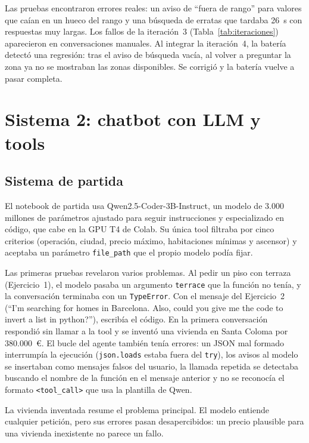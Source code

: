 \documentclass[10pt,a4paper]{article}
\begin{document}
Las pruebas encontraron errores reales: un aviso de ``fuera de rango'' para valores que caían en un hueco del rango y una búsqueda de erratas que tardaba 26~s con respuestas muy largas. Los fallos de la iteración~3 (Tabla~\ref{tab:iteraciones}) aparecieron en conversaciones manuales. Al integrar la iteración~4, la batería detectó una regresión: tras el aviso de búsqueda vacía, al volver a preguntar la zona ya no se mostraban las zonas disponibles. Se corrigió y la batería vuelve a pasar completa.

\section{Sistema 2: chatbot con LLM y tools}

\subsection{Sistema de partida}

El notebook de partida usa Qwen2.5-Coder-3B-Instruct, un modelo de 3.000 millones de parámetros ajustado para seguir instrucciones y especializado en código, que cabe en la GPU T4 de Colab. Su única tool filtraba por cinco criterios (operación, ciudad, precio máximo, habitaciones mínimas y ascensor) y aceptaba un parámetro \texttt{file\_path} que el propio modelo podía fijar.

Las primeras pruebas revelaron varios problemas. Al pedir un piso con terraza (Ejercicio~1), el modelo pasaba un argumento \texttt{terrace} que la función no tenía, y la conversación terminaba con un \texttt{TypeError}. Con el mensaje del Ejercicio~2 (``I'm searching for homes in Barcelona. Also, could you give me the code to invert a list in python?''), escribía el código. En la primera conversación respondió sin llamar a la tool y se inventó una vivienda en Santa Coloma por 380.000~€. El bucle del agente también tenía errores: un JSON mal formado interrumpía la ejecución (\texttt{json.loads} estaba fuera del \texttt{try}), los avisos al modelo se insertaban como mensajes falsos del usuario, la llamada repetida se detectaba buscando el nombre de la función en el mensaje anterior y no se reconocía el formato \texttt{<tool\_call>} que usa la plantilla de Qwen.

La vivienda inventada resume el problema principal. El modelo entiende cualquier petición, pero sus errores pasan desapercibidos: un precio plausible para una vivienda inexistente no parece un fallo.
\end{document}
